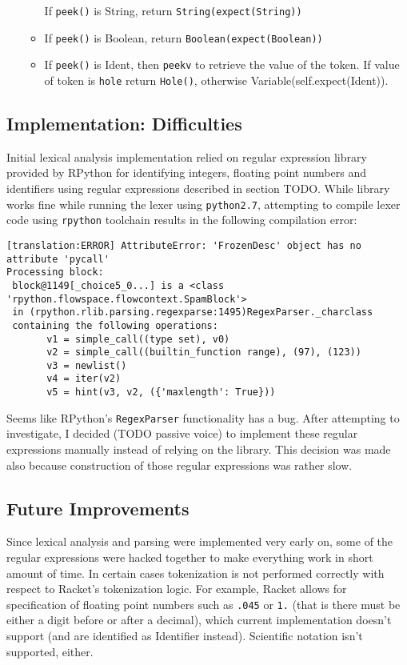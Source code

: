 \begin{itemize}
\begin{itemize}
		If \texttt{peek()} is String, return \texttt{String(expect(String))}
	\item
		If \texttt{peek()} is Boolean, return \texttt{Boolean(expect(Boolean))}
	\item

		If \texttt{peek()} is Ident, then \texttt{peekv} to retrieve the value of the token. If value of token is \texttt{hole} return \texttt{Hole()}, otherwise Variable(self.expect(Ident)).
	\end{itemize}
	

\end{itemize}

\subsection{Implementation: Difficulties}
Initial lexical analysis implementation relied on regular expression library provided by RPython for identifying integers, floating point numbers and identifiers using regular expressions described in section TODO. While library works fine while running the lexer using \texttt{python2.7}, attempting to compile lexer code using \texttt{rpython} toolchain results in the following compilation error:

\begin{lstlisting}
[translation:ERROR] AttributeError: 'FrozenDesc' object has no attribute 'pycall'
Processing block:
 block@1149[_choice5_0...] is a <class 'rpython.flowspace.flowcontext.SpamBlock'> 
 in (rpython.rlib.parsing.regexparse:1495)RegexParser._charclass 
 containing the following operations: 
       v1 = simple_call((type set), v0) 
       v2 = simple_call((builtin_function range), (97), (123)) 
       v3 = newlist() 
       v4 = iter(v2) 
       v5 = hint(v3, v2, ({'maxlength': True})) 
\end{lstlisting}

Seems like RPython's \texttt{RegexParser} functionality has a bug. After attempting to investigate, I decided (TODO passive voice) to implement these regular expressions manually instead of relying on the library. This decision was made also because construction of those regular expressions was rather slow.

\subsection{Future Improvements}

Since lexical analysis and parsing were implemented very early on, some of the regular expressions were hacked together to make everything work in short amount of time. In certain cases tokenization is not performed correctly with respect to Racket's tokenization logic. For example, Racket allows for specification of floating point numbers such as \texttt{.045} or \texttt{1.} (that is there must be either a digit before or after a decimal), which current implementation doesn't support (and are identified as Identifier instead). Scientific notation isn't supported, either.
